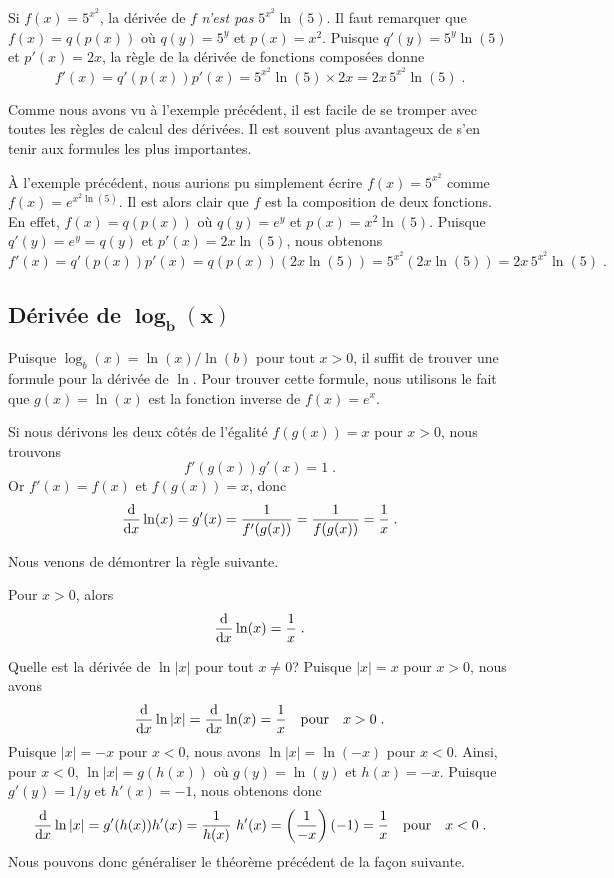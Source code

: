 {\begin{egg}
Si $f(x) = 5^{x^2}$, la dérivée de $f$ {\em n'est pas}
$5^{x^2}\ln(5)$.  Il faut remarquer que $f(x) = q(p(x))$ où
$q(y) = 5^y$ et $p(x)=x^2$.  Puisque $q'(y) = 5^y \ln(5)$ et $p'(x) = 2 x$,
la règle de la dérivée de fonctions composées donne
\[
f'(x) = q'(p(x)) p'(x) = 5^{x^2}\ln(5) \times 2x 
= 2x\, 5^{x^2} \ln(5)\; .
\]
\end{egg}

\begin{rmk}
Comme nous avons vu à l'exemple précédent, il est facile de se tromper avec
toutes les règles de calcul des dérivées.  Il est souvent plus
avantageux de s'en tenir aux formules les plus importantes.

À l'exemple précédent, nous aurions pu simplement écrire $f(x) = 5^{x^2}$
comme $f(x) = e^{x^2\ln(5)}$.  Il est alors clair que $f$ est la
composition de deux fonctions.  En effet, $f(x) = q(p(x))$ où $q(y) = e^y$
et $p(x) = x^2 \ln(5)$.  Puisque $q'(y) = e^y = q(y)$ et $p'(x) = 2x \ln(5)$,
nous obtenons
\[
f'(x) = q'(p(x))p'(x) = q({p(x)}) ( 2x \ln(5) )
= 5^{x^2} (2x \ln(5)) = 2x\, 5^{x^2}\ln(5) \; .
\]
\end{rmk}

\subsection{Dérivée de $\mathbf{\log_b(x)}$}

Puisque $\log_b(x) = \ln(x) / \ln(b)$ pour tout $x>0$, il suffit de
trouver une formule pour la dérivée de $\ln$.  Pour trouver cette
formule, nous utilisons le fait que $g(x)=\ln(x)$ est la fonction inverse
de $f(x) = e^x$.

Si nous dérivons les deux côtés de l'égalité $f(g(x))= x$ pour $x>0$,
nous trouvons
\[
f'(g(x))g'(x) = 1 \; .
\]
Or $f'(x) = f(x)$ et $f(g(x))=x$, donc
\[
\dfdx{\ln(x)}{x} = g'(x) = \frac{1}{f'(g(x))}
= \frac{1}{f(g(x))} = \frac{1}{x} \; .
\]

Nous venons de démontrer la règle suivante.

\begin{focus}{\prp}
Pour $x>0$, alors
\[
\dfdx{\ln(x)}{x} = \frac{1}{x} \; .
\]
\end{focus}

Quelle est la dérivée de $\ln |x|$ pour tout $x \neq 0$?  Puisque
$|x|=x$ pour $x>0$, nous avons
\[
\dfdx{\ln|x|}{x} = \dfdx{\ln(x)}{x} = \frac{1}{x} \quad \text{pour}
\quad x>0 \;.
\]
Puisque $|x|=-x$ pour $x<0$, nous avons $\ln|x| = \ln(-x)$ pour $x<0$.
Ainsi, pour $x<0$, $\ln|x| = g(h(x))$ où $g(y) = \ln(y)$ et
$h(x) = -x$.  Puisque $g'(y) = 1/y$ et $h'(x) = -1$, nous obtenons donc
\[
\dfdx{\ln|x|}{x} = g'(h(x)) h'(x) = \frac{1}{h(x)} \ h'(x) =
\left(\frac{1}{-x}\right) (-1) = \frac{1}{x} \quad \text{pour} \quad x< 0 \; .
\]
Nous pouvons donc généraliser le théorème précédent de la façon suivante.

}

